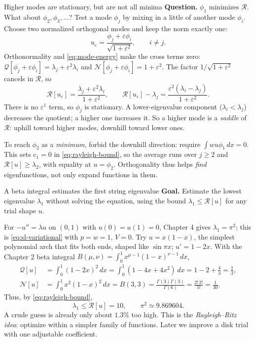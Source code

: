 \documentclass[11pt]{beamer}
\newcommand{\dd}{\,d}
\newcommand{\Q}{\mathcal Q}
\newcommand{\N}{\mathcal N}
\newcommand{\R}{\mathcal R}
\begin{document}
\begin{frame}{Higher modes are stationary, but are not all minima}
\small
\textbf{Question.} \(\phi_1\) minimizes \(\R\). What about \(\phi_2,\phi_3,\dots\)? Test a mode \(\phi_j\) by mixing in a little of
another mode \(\phi_i\).
Choose two normalized orthogonal modes and keep the norm exactly one:
\[
 u_\varepsilon=\frac{\phi_j+\varepsilon\phi_i}{\sqrt{1+\varepsilon^2}},
 \qquad i\ne j.
\]
Orthonormality and \eqref{eq:mode-energy} make the cross terms zero:
$\Q[\phi_j+\varepsilon\phi_i]=\lambda_j+\varepsilon^2\lambda_i$ and
$\N[\phi_j+\varepsilon\phi_i]=1+\varepsilon^2$. The factor $1/\sqrt{1+\varepsilon^2}$ cancels in $\R$, so
\[
 \R[u_\varepsilon]=\frac{\lambda_j+\varepsilon^2\lambda_i}{1+\varepsilon^2},
 \qquad
 \R[u_\varepsilon]-\lambda_j
 =\frac{\varepsilon^2(\lambda_i-\lambda_j)}{1+\varepsilon^2}.
\]
There is no $\varepsilon^1$ term, so $\phi_j$ is stationary. A lower-eigenvalue component
($\lambda_i<\lambda_j$) decreases the quotient; a higher one increases it.
So a higher mode is a \emph{saddle} of $\R$: uphill toward higher modes, downhill toward lower ones.

\medskip
To reach $\phi_2$ as a \emph{minimum}, forbid the downhill direction: require
$\int wu\phi_1\dd x=0$. This sets $c_1=0$ in \eqref{eq:rayleigh-bound}, so the average
runs over $j\ge2$ and $\R[u]\ge\lambda_2$, with equality at $u=\phi_2$.
Orthogonality thus helps \emph{find} eigenfunctions, not only expand functions in them.
\end{frame}

\begin{frame}{A beta integral estimates the first string eigenvalue}
\small
\textbf{Goal.} Estimate the lowest eigenvalue $\lambda_1$ without solving the equation, using
the bound $\lambda_1\le\R[u]$ for any trial shape $u$.

For $-u''=\lambda u$ on $(0,1)$ with $u(0)=u(1)=0$, Chapter 4 gives
$\lambda_1=\pi^2$; this is \eqref{eq:sl-variational} with $p=w=1$, $V=0$.
Try $u=x(1-x)$, the simplest polynomial arch that fits both ends, shaped like
$\sin\pi x$; $u'=1-2x$. With the Chapter 2 beta
integral $B(\mu,\nu)=\int_0^1x^{\mu-1}(1-x)^{\nu-1}\dd x$,
\begin{align*}
 \Q[u]&=\int_0^1(1-2x)^2\dd x
       =\int_0^1(1-4x+4x^2)\dd x
       =1-2+\frac43=\frac13,\\
 \N[u]&=\int_0^1x^2(1-x)^2\dd x
       =B(3,3)=\frac{\Gamma(3)\Gamma(3)}{\Gamma(6)}
       =\frac{2!\,2!}{5!}=\frac1{30}.
\end{align*}
Thus, by \eqref{eq:rayleigh-bound},
\[
 \lambda_1\le\R[u]=10,
 \qquad \pi^2\simeq9.869604.
\]
A crude guess is already only about $1.3\%$ too high. This is the \emph{Rayleigh--Ritz idea}: optimize
within a simpler family of functions. Later we improve a disk trial with one adjustable coefficient.
\end{frame}
\end{document}
